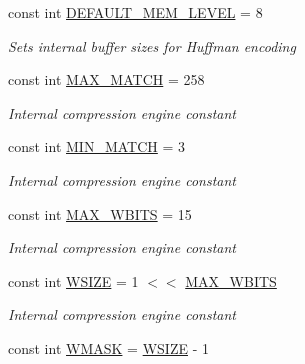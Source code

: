 \begin{DoxyCompactItemize}
const int \hyperlink{class_i_c_sharp_code_1_1_sharp_zip_lib_1_1_zip_1_1_compression_1_1_deflater_constants_adedc568bd79ed8001d1de9c93b751033}{D\+E\+F\+A\+U\+L\+T\+\_\+\+M\+E\+M\+\_\+\+L\+E\+V\+EL} = 8
\begin{DoxyCompactList}\small\item\em Sets internal buffer sizes for Huffman encoding \end{DoxyCompactList}\item 
const int \hyperlink{class_i_c_sharp_code_1_1_sharp_zip_lib_1_1_zip_1_1_compression_1_1_deflater_constants_a3deccd8f717e4457bbc48df1549aa9b7}{M\+A\+X\+\_\+\+M\+A\+T\+CH} = 258
\begin{DoxyCompactList}\small\item\em Internal compression engine constant \end{DoxyCompactList}\item 
const int \hyperlink{class_i_c_sharp_code_1_1_sharp_zip_lib_1_1_zip_1_1_compression_1_1_deflater_constants_afbb20dd9ee7a8034ad9158319a185a17}{M\+I\+N\+\_\+\+M\+A\+T\+CH} = 3
\begin{DoxyCompactList}\small\item\em Internal compression engine constant \end{DoxyCompactList}\item 
const int \hyperlink{class_i_c_sharp_code_1_1_sharp_zip_lib_1_1_zip_1_1_compression_1_1_deflater_constants_a1514f696217dc6427749197bc3aab5b1}{M\+A\+X\+\_\+\+W\+B\+I\+TS} = 15
\begin{DoxyCompactList}\small\item\em Internal compression engine constant \end{DoxyCompactList}\item 
const int \hyperlink{class_i_c_sharp_code_1_1_sharp_zip_lib_1_1_zip_1_1_compression_1_1_deflater_constants_a3e1ad9d347115b6c72aefea84127174d}{W\+S\+I\+ZE} = 1 $<$$<$ \hyperlink{class_i_c_sharp_code_1_1_sharp_zip_lib_1_1_zip_1_1_compression_1_1_deflater_constants_a1514f696217dc6427749197bc3aab5b1}{M\+A\+X\+\_\+\+W\+B\+I\+TS}
\begin{DoxyCompactList}\small\item\em Internal compression engine constant \end{DoxyCompactList}\item 
const int \hyperlink{class_i_c_sharp_code_1_1_sharp_zip_lib_1_1_zip_1_1_compression_1_1_deflater_constants_a5fb96961b739d7f56fe8809c760c1587}{W\+M\+A\+SK} = \hyperlink{class_i_c_sharp_code_1_1_sharp_zip_lib_1_1_zip_1_1_compression_1_1_deflater_constants_a3e1ad9d347115b6c72aefea84127174d}{W\+S\+I\+ZE} -\/ 1
$$
\end{DoxyCompactItemize}
